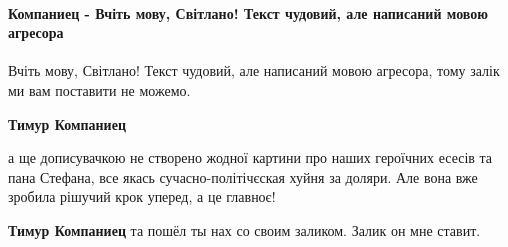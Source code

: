  
 
 
 
 
\paragraph{Компаниец - Вчіть мову, Світлано! Текст чудовий, але написаний мовою агресора}
\label{sec:14_07_2021.fb.krjukova_svetlana.1.statja_putina_mnenie.cmt.kompaniec_mova}

\begin{itemize}
 
Вчіть мову, Світлано! Текст чудовий, але написаний мовою агресора, тому залік ми вам поставити не можемо.

\begin{itemize}
 
\textbf{Тимур Компаниец} 

а ще дописувачкою не створено жодної картини про наших героїчних есесів та пана
Стефана, все якась сучасно-політічєская хуйня за доляри. Але вона вже зробила
рішучий крок уперед, а це главноє!


 
\textbf{Тимур Компаниец} та пошёл ты нах со своим заликом. Залик он мне ставит.

 

\end{itemize}
\end{itemize}

